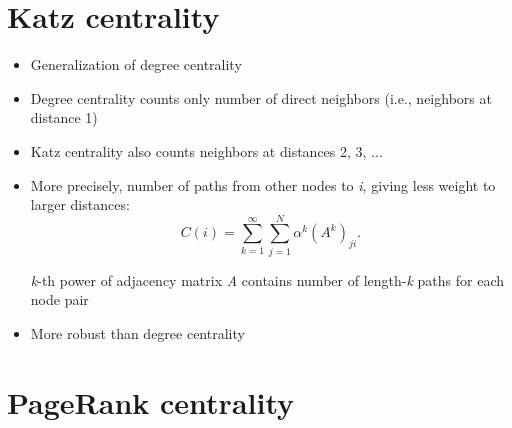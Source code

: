 \documentclass[11pt]{article}
\begin{document}
\section*{Katz centrality}
\begin{itemize}
	\item Generalization of degree centrality
	\item Degree centrality counts only number of direct neighbors (i.e., neighbors at distance 1)
	\item Katz centrality also counts neighbors at distances 2, 3, ...
	\item More precisely, number of paths from other nodes to \textit{i}, giving less weight to larger distances: \\
		\[
			C(i) = \sum\limits_{k=1}^{\infty} \sum\limits_{j=1}^{N} \alpha^{k} (A^{k})_{ji}
		.\] 
	\begin{tcolorbox}[
	  colback=gray!15,     %
	  colframe=black!50,    %
	  boxrule=1pt,       %
	  arc=3mm,             %
	  left=4mm, right=4mm, top=2mm, bottom=2mm %
	]
	\textit{k}-th power of adjacency matrix \textit{A} contains number of length-\textit{k} paths for each node pair
	\end{tcolorbox}
	\item More robust than degree centrality
\end{itemize}
\section*{PageRank centrality}
\end{document}
